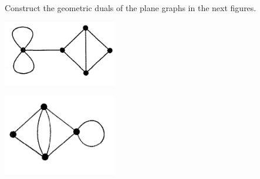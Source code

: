 \prob
{
    Construct the geometric duals of the plane graphs in the next figures.
		    \begin{center}
                \includegraphics[width=5cm]{Test2/Problem10/Figure1_4.png}
            \end{center}\pn
						
			\begin{center}
                \includegraphics[width=5cm]{Test2/Problem10/Figure1_28.png}
            \end{center}\pn
}
